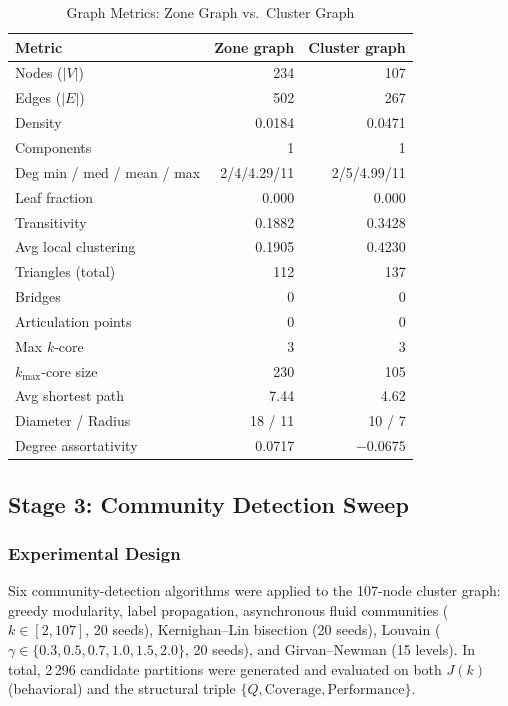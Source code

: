 \documentclass[conference]{IEEEtran}
\begin{document}
\begin{table}[t]
\centering
\caption{Graph Metrics: Zone Graph vs.\ Cluster Graph}
\label{tab:graph_metrics}
\scriptsize
\begin{tabular}{lrr}
\toprule
Metric & Zone graph & Cluster graph \\
\midrule
Nodes ($|V|$)             & 234     & 107 \\
Edges ($|E|$)             & 502     & 267 \\
Density                   & 0.0184  & 0.0471 \\
Components                & 1       & 1 \\
Deg min / med / mean / max & 2/4/4.29/11 & 2/5/4.99/11 \\
Leaf fraction             & 0.000   & 0.000 \\
Transitivity              & 0.1882  & 0.3428 \\
Avg local clustering      & 0.1905  & 0.4230 \\
Triangles (total)         & 112     & 137 \\
Bridges                   & 0       & 0 \\
Articulation points       & 0       & 0 \\
Max $k$-core              & 3       & 3 \\
$k_{\max}$-core size      & 230     & 105 \\
Avg shortest path         & 7.44    & 4.62 \\
Diameter / Radius         & 18 / 11 & 10 / 7 \\
Degree assortativity      & 0.0717  & $-0.0675$ \\
\bottomrule
\end{tabular}
\end{table}

\subsection{Stage 3: Community Detection Sweep}

\subsubsection{Experimental Design}
Six community-detection algorithms were applied to the 107-node cluster
graph:
greedy modularity, label propagation, asynchronous fluid communities
($k\in[2,107]$, 20 seeds), Kernighan--Lin bisection (20 seeds),
Louvain \cite{Blondel2008} ($\gamma\in\{0.3,0.5,0.7,1.0,1.5,2.0\}$, 20 seeds), and
Girvan--Newman (15 levels).
In total, 2\,296 candidate partitions were generated and evaluated on
both $J(k)$ (behavioral) and the structural triple
$\{Q, \mathrm{Coverage}, \mathrm{Performance}\}$.
\end{document}
